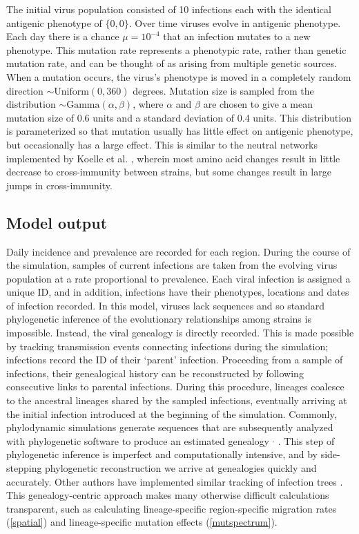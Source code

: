 The initial virus population consisted of 10 infections each with the identical antigenic phenotype of $\{0,0\}$.  Over time viruses evolve in antigenic phenotype.  Each day there is a chance $\mu = 10^{-4}$ that an infection mutates to a new phenotype.  This mutation rate represents a phenotypic rate, rather than genetic mutation rate, and can be thought of as arising from multiple genetic sources.  When a mutation occurs, the virus's phenotype is moved in a completely random direction $\sim \textrm{Uniform}(0,360)$ degrees. Mutation size is sampled from the distribution $\sim \textrm{Gamma}(\alpha,\beta)$, where $\alpha$ and $\beta$ are chosen to give a mean mutation size of 0.6 units and a standard deviation of 0.4 units.  This distribution is parameterized so that mutation usually has little effect on antigenic phenotype, but occasionally has a large effect.  This is similar to the neutral networks implemented by Koelle et al. \cite{Koelle06}, wherein most amino acid changes result in little decrease to cross-immunity between strains, but some changes result in large jumps in cross-immunity.

\subsection*{Model output}

Daily incidence and prevalence are recorded for each region.  During the course of the simulation, samples of current infections are taken from the evolving virus population at a rate proportional to prevalence.  Each viral infection is assigned a unique ID, and in addition, infections have their phenotypes, locations and dates of infection recorded.  In this model, viruses lack sequences and so standard phylogenetic inference of the evolutionary relationships among strains is impossible.  Instead, the viral genealogy is directly recorded.  This is made possible by tracking transmission events connecting infections during the simulation; infections record the ID of their `parent' infection.  Proceeding from a sample of infections, their genealogical history can be reconstructed by following consecutive links to parental infections.  During this procedure, lineages coalesce to the ancestral lineages shared by the sampled infections, eventually arriving at the initial infection introduced at the beginning of the simulation.  Commonly, phylodynamic simulations generate sequences that are subsequently analyzed with phylogenetic software to produce an estimated genealogy \cite{Ferguson03,Koelle06}$^,$ .  This step of phylogenetic inference is imperfect and computationally intensive, and by side-stepping phylogenetic reconstruction we arrive at genealogies quickly and accurately.  Other authors have implemented similar tracking of infection trees .  This genealogy-centric approach makes many otherwise difficult calculations transparent, such as calculating lineage-specific region-specific migration rates (\ref{spatial}) and lineage-specific mutation effects (\ref{mutspectrum}).

